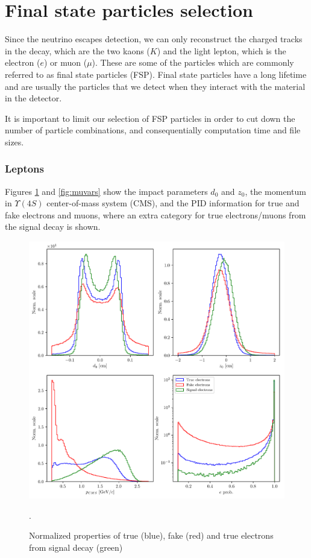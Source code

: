 \documentclass[  headings=standardclasses,
  headings=big,oneside,a4paper,openany,12pt]{scrbook}
\begin{document}
\section{Final state particles selection}

Since the neutrino escapes detection, we can only reconstruct the charged tracks in the decay, which are the two kaons ($K$) and the light lepton, which is the electron ($e$) or muon ($\mu$). These are some of the particles which are commonly referred to as final state particles (FSP). Final state particles have a long lifetime and are usually the particles that we detect when they interact with the material in the detector.

It is important to limit our selection of FSP particles in order to cut down the number of particle combinations,  and consequentially computation time and file sizes.

\subsubsection{Leptons}

Figures \ref{fig:evars} and \ref{fig:muvars} show the impact parameters $d_0$ and $z_0$, the momentum in  $\Upsilon(4S)$ center-of-mass system (CMS), and the PID information for true and fake electrons and muons, where an extra category for true electrons/muons from the signal decay is shown.

\begin{figure}[H]
\centering
\includegraphics[width=\linewidth]{fig/FSP_e_vars}
\captionsetup{width=.8\linewidth}
\caption{Normalized properties of true (blue), fake (red) and true electrons from signal decay (green)}.
\label{fig:evars}
\end{figure}
\end{document}
